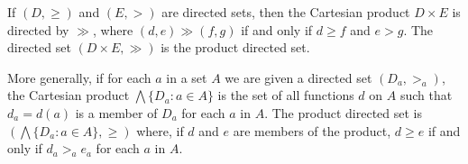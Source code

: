 If $(D, \geq)$ and $(E, >)$ are directed sets, then the Cartesian product $D \times E$ is directed by $\gg$, where $(d, e) \gg (f, g)$ if and only if $d \geq f$ and $e > g$. The directed set $(D \times E, \gg)$ is the product directed set.

More generally, if for each $a$ in a set $A$ we are given a directed set $(D_a, >_a)$, the Cartesian product $\bigwedge \{D_a : a \in A\}$ is the set of all functions $d$ on $A$ such that $d_a = d(a)$ is a member of $D_a$ for each $a$ in $A$. The product directed set is $(\bigwedge \{D_a : a \in A\}, \geq)$ where, if $d$ and $e$ are members of the product, $d \geq e$ if and only if $d_a >_a e_a$ for each $a$ in $A$.
